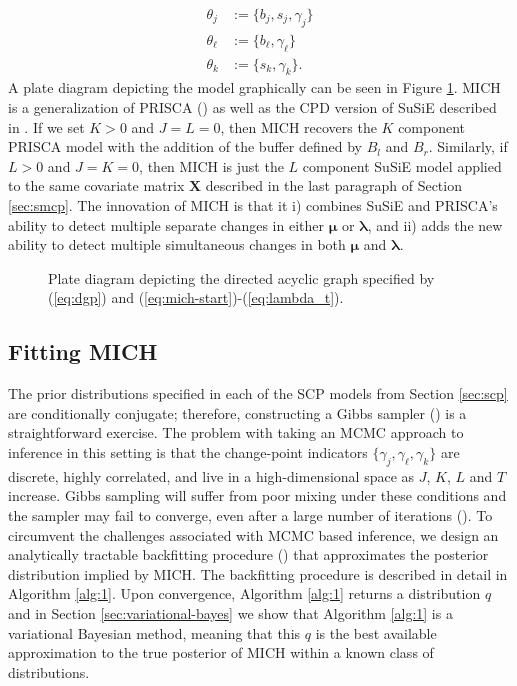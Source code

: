 \begin{align}
    \theta_j &:= \{b_j,s_j,\gamma_j\} \\
    \theta_\ell &:= \{b_\ell, \gamma_\ell\} \\
    \theta_k &:= \{s_k, \gamma_k\}.
\end{align}
A plate diagram depicting the model graphically can be seen in Figure \ref{fig:plate-diagram}. MICH is a generalization of PRISCA (\citealp{Cappello22}) as well as the CPD version of SuSiE described in \cite{Wang20}. If we set $K > 0$ and $J=L=0$, then MICH recovers the $K$ component PRISCA model with the addition of the buffer defined by $B_l$ and $B_r$. Similarly, if $L > 0$ and $J=K=0$, then MICH is just the $L$ component SuSiE model applied to the same covariate matrix $\mathbf{X}$ described in the last paragraph of Section \ref{sec:smcp}. The innovation of MICH is that it i) combines SuSiE and PRISCA's ability to detect multiple separate changes in either $\boldsymbol{\mu}$ or $\boldsymbol{\lambda}$, and ii) adds the new ability to detect multiple simultaneous changes in both $\boldsymbol{\mu}$ and $\boldsymbol{\lambda}$.

\begin{figure}
    \centering
    
    \caption{Plate diagram depicting the directed acyclic graph specified by (\ref{eq:dgp}) and (\ref{eq:mich-start})-(\ref{eq:lambda_t}).}
    \label{fig:plate-diagram}
\end{figure}  

\subsection{Fitting MICH}

The prior distributions specified in each of the SCP models from Section \ref{sec:scp} are conditionally conjugate; therefore, constructing a Gibbs sampler (\citealp{Geman84}) is a straightforward exercise. The problem with taking an MCMC approach to inference in this setting is that the change-point indicators $\{\gamma_j,\gamma_\ell,\gamma_k\}$ are discrete, highly correlated, and live in a high-dimensional space as $J$, $K$, $L$ and $T$ increase. Gibbs sampling will suffer from poor mixing under these conditions and the sampler may fail to converge, even after a large number of iterations (\citealp{Smith93, Cappello21}). To circumvent the challenges associated with MCMC based inference, we design an analytically tractable backfitting procedure (\citealp{Friedman81, Breiman85}) that approximates the posterior distribution implied by MICH. The backfitting procedure is described in detail in Algorithm \ref{alg:1}. Upon convergence, Algorithm \ref{alg:1} returns a distribution $q$ and in Section \ref{sec:variational-bayes} we show that Algorithm \ref{alg:1} is a variational Bayesian method, meaning that this $q$ is the best available approximation to the true posterior of MICH within a known class of distributions. 

